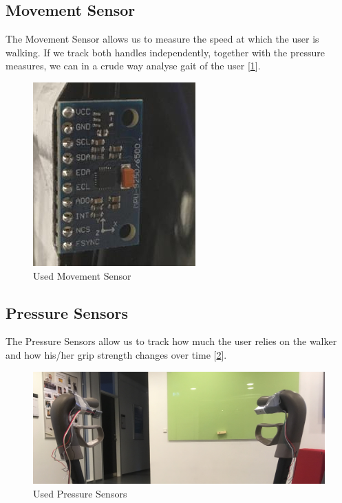 \subsection{Movement Sensor}
The Movement Sensor allows us to measure the speed at which the user is walking. If we track both handles independently, together with the pressure measures, we can in a crude way analyse gait of the user [\ref{fig:walkerpictures_movement}].

\begin{figure}[h!]
	\centering
	\includegraphics[width=0.7\linewidth]{gfx/walkerpictures/movement}
	\caption{Used Movement Sensor}
	\label{fig:walkerpictures_movement}
\end{figure}

\subsection{Pressure Sensors}
The Pressure Sensors allow us to track how much the user relies on the walker and how his/her grip strength changes over time [\ref{fig:walkerpictures_pressure}].

\begin{figure}[h!]
	\centering
	\includegraphics[width=0.7\linewidth]{gfx/walkerpictures/pressure}
	\caption{Used Pressure Sensors}
	\label{fig:walkerpictures_pressure}
\end{figure}


